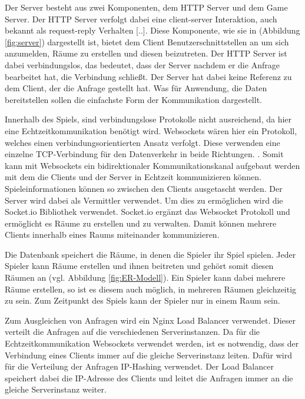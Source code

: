\documentclass[
]{article}
\begin{document}
Der Server besteht aus zwei Komponenten, dem HTTP Server und dem Game Server.
Der HTTP Server verfolgt dabei eine \glqq  [..] client-server Interaktion, auch bekannt als 
request-reply Verhalten [..]\grqq{}\cite[S.37 ff.]{tanenbaum2007distributed}.
Diese Komponente, wie sie in (Abbildung \ref{fig:server}) dargestellt ist,
bietet dem Client Benutzerschnittstellen an um sich anzumelden, Räume zu erstellen und diesen beizutreten.
Der HTTP Server ist dabei verbindungslos, das bedeutet, 
dass der Server nachdem er die Anfrage bearbeitet hat, die Verbindung schließt.
Der Server hat dabei keine Referenz zu dem Client, der die Anfrage gestellt hat.
Was für Anwendung, die Daten bereitstellen sollen die einfachste Form der Kommunikation dargestellt.

Innerhalb des Spiels, sind verbindungslose Protokolle nicht ausreichend, da hier eine Echtzeitkommunikation benötigt wird.
Websockets wären hier ein Protokoll, welches einen verbindungsorientierten Ansatz verfolgt.
Diese \glqq [..] verwenden eine einzelne TCP-Verbindung für den Datenverkehr in beide Richtungen. 
\grqq{} \cite[Kapitel 1.1]{rfc-websocket}.
Somit kann mit Websockets ein bidirektionaler Kommunikationskanal aufgebaut werden mit dem die Clients 
und der Server in Echtzeit kommunizieren können.
Spieleinformationen können so zwischen den Clients ausgetascht werden. 
Der Server wird dabei als Vermittler verwendet. Um dies zu ermöglichen wird die Socket.io Bibliothek verwendet.
Socket.io ergänzt das Websocket Protokoll und ermöglicht es Räume zu erstellen und zu verwalten.
Damit können mehrere Clients innerhalb eines Raums miteinander kommunizieren.

Die Datenbank speichert die Räume, in denen die Spieler ihr Spiel spielen. 
Jeder Spieler kann Räume erstellen und ihnen beitreten und gehört somit diesen 
Räumen an (vgl. Abbildung \ref{fig:ER-Modell}).
Ein Spieler kann dabei mehrere Räume erstellen, so ist es diesem auch möglich, in mehreren Räumen gleichzeitig zu sein.
Zum Zeitpunkt des Spiels kann der Spieler nur in einem Raum sein.

Zum Ausgleichen von Anfragen wird ein Nginx Load Balancer verwendet.
Dieser verteilt die Anfragen auf die verschiedenen Serverinstanzen.
Da für die Echtzeitkommunikation Websockets verwendet werden, ist es notwendig,
dass der Verbindung eines Clients immer auf die gleiche Serverinstanz leiten.
Dafür wird für die Verteilung der Anfragen IP-Hashing verwendet.
Der Load Balancer speichert dabei die IP-Adresse des Clients und 
leitet die Anfragen immer an die gleiche Serverinstanz weiter.
\end{document}
